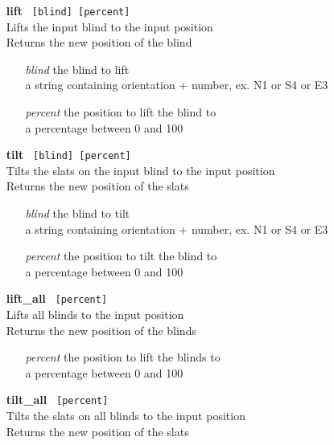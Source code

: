 \documentclass[twoside]{article}
\begin{document}
	\begin{enumerate}
		\item[\bf lift]\verb| [blind] [percent]|\\
		Lifts the input blind to the input position\\
		Returns the new position of the blind
	
		\begin{enumerate}[leftmargin=3\parindent]
			\item[\it blind] the blind to lift\\
			a string containing orientation + number, ex. N1 or S4 or E3
			\item[\it percent] the position to lift the blind to\\
			a percentage between 0 and 100
		\end{enumerate}
	
		\item[\bf tilt]\verb| [blind] [percent]|\\
		Tilts the slats on the input blind to the input position\\
		Returns the new position of the slats
	
		\begin{enumerate}[leftmargin=3\parindent]
			\item[\it blind] the blind to tilt\\
			a string containing orientation + number, ex. N1 or S4 or E3
			\item[\it percent] the position to tilt the blind to\\
			a percentage between 0 and 100
		\end{enumerate}
		
		\item[\bf lift\_all]\verb| [percent]|\\
		Lifts all blinds to the input position\\
		Returns the new position of the blinds
		
		\begin{enumerate}[leftmargin=3\parindent]
			\item[\it percent] the position to lift the blinds to\\
			a percentage between 0 and 100
		\end{enumerate}
		
		\item[\bf tilt\_all]\verb| [percent]|\\
		Tilts the slats on all blinds to the input position\\
		Returns the new position of the slats
		

\end{enumerate}
\end{document}
